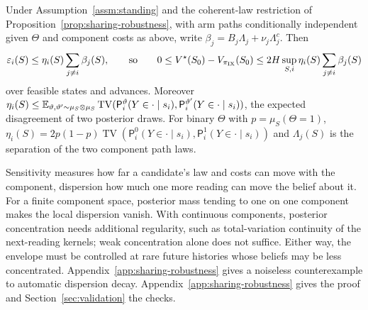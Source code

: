 \begin{corollary}\label{cor:component}
Under Assumption~\ref{assm:standing} and the coherent-law restriction of Proposition~\ref{prop:sharing-robustness}, with arm paths conditionally independent given $\Theta$ and component costs as above, write $\beta_j=B_j\Lambda_j+\nu_j\Lambda^c_j$. Then
\[
 \varepsilon_i(S)\le\eta_i(S)\sum_{j\ne i}\beta_j(S),
 \qquad\text{so}\qquad
 0\le V^\star(S_0)-V_{\pi_{\rm IX}}(S_0)\le 2H\sup_{S,i}\eta_i(S)\sum_{j\ne i}\beta_j(S)
\]
over feasible states and advances. Moreover
$\eta_i(S)\le\mathbb{E}_{\vartheta,\vartheta'\sim\mu_S\otimes\mu_S}
\operatorname{TV}(\mathsf P_i^\vartheta(Y\in\cdot\mid s_i),\mathsf P_i^{\vartheta'}(Y\in\cdot\mid s_i))$,
the expected disagreement of two posterior draws. For binary $\Theta$ with
$p=\mu_S(\Theta=1)$, $\eta_i(S)=2p(1-p)\operatorname{TV}(\mathsf P_i^0(Y\in\cdot\mid s_i),\mathsf P_i^1(Y\in\cdot\mid s_i))$
and $\Lambda_j(S)$ is the separation of the two component path laws.
\end{corollary}

Sensitivity measures how far a candidate's law and costs can move with the component,
dispersion how much one more reading can move the belief about it.
For a finite component space, posterior mass tending to one on one component makes
the local dispersion vanish. With continuous components, posterior concentration needs
additional regularity, such as total-variation continuity of the next-reading kernels;
weak concentration alone does not suffice. Either way, the envelope must be controlled at
rare future histories whose beliefs may be less concentrated. Appendix~\ref{app:sharing-robustness} gives a noiseless
counterexample to automatic dispersion decay.
Appendix~\ref{app:sharing-robustness} gives the proof and Section~\ref{sec:validation} the
checks.
